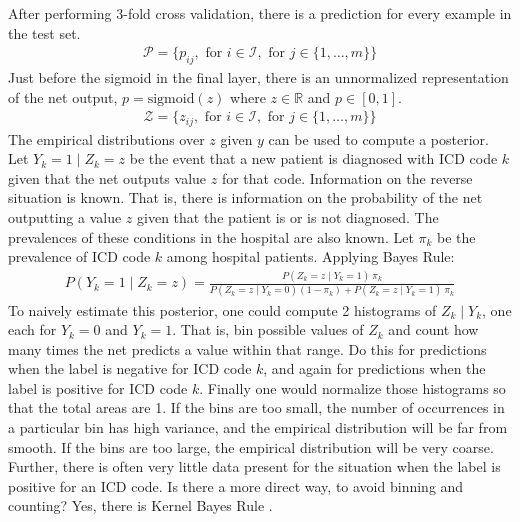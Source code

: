 After performing 3-fold cross validation, there is a prediction for every example in the test set.
\begin{gather}
    \mathcal{P} = \{
        p_{ij},
        \text{ for } i \in \mathcal{I},
        \text{ for } j \in \{ 1, \dots, m \}
    \}
\end{gather}
Just before the sigmoid in the final layer, there is an unnormalized representation of the net output, $p = \text{sigmoid}(z)$ where $z \in \mathbb{R}$ and $p \in [0, 1]$.
\begin{gather}
    \mathcal{Z} = \{
        z_{ij},
        \text{ for } i \in \mathcal{I},
        \text{ for } j \in \{ 1, \dots, m \}
    \}
\end{gather}
The empirical distributions over $z$ given $y$ can be used to compute a posterior.  Let $Y_k = 1 \mid Z_k = z$ be the event that a new patient is diagnosed with ICD code $k$ given that the net outputs value $z$ for that code.  Information on the reverse situation is known.  That is, there is information on the probability of the net outputting a value $z$ given that the patient is or is not diagnosed.  The prevalences of these conditions in the hospital are also known.  Let $\pi_k$ be the prevalence of ICD code $k$ among hospital patients.  Applying Bayes Rule:
\begin{gather}
    P(Y_k = 1 \mid Z_k = z) = \frac
        {P(Z_k = z \mid Y_k = 1) \ \pi_k}
        {P(Z_k = z \mid Y_k = 0) (1 - \pi_k) + P(Z_k = z \mid Y_k = 1) \ \pi_k}
\end{gather}
To naively estimate this posterior, one could compute 2 histograms of $Z_k \mid Y_k$, one each for $Y_k=0$ and $Y_k=1$.  That is, bin possible values of $Z_k$ and count how many times the net predicts a value within that range.  Do this for predictions when the label is negative for ICD code $k$, and again for predictions when the label is positive for ICD code $k$.  Finally one would normalize those histograms so that the total areas are 1.  If the bins are too small, the number of occurrences in a particular bin has high variance, and the empirical distribution will be far from smooth.  If the bins are too large, the empirical distribution will be very coarse.  Further, there is often very little data present for the situation when the label is positive for an ICD code.  Is there a more direct way, to avoid binning and counting?  Yes, there is Kernel Bayes Rule \cite{fukumizu2013kernel}.

